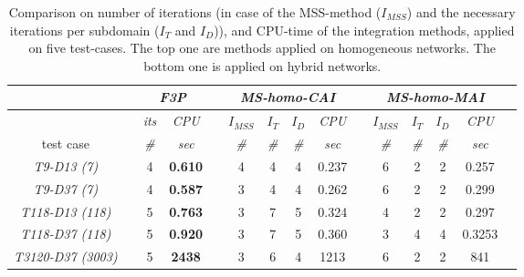 \begin{table}[!ht]
\renewcommand{\arraystretch}{1.3}
\centering
\caption{Comparison on number of iterations (in case of the MSS-method ($I_{MSS}$) and the necessary iterations per subdomain ($I_T$ and $I_D$)), and CPU-time of the integration methods, applied on five test-cases. The top one are methods applied on homogeneous networks. The bottom one is applied on hybrid networks. }\label{tab:speed}
\begin{adjustbox}{width=1\textwidth} %
\small
\begin{tabular}{@{}l c cc c  cccc c cccc c  @{}}\toprule
                               && \multicolumn{2}{c}{\textit{F3P}} &&     \multicolumn{4}{c}{\textit{MS-homo-CAI}} && \multicolumn{4}{c}{\textit{MS-homo-MAI}} \\ \midrule 
\multicolumn{1}{l}{}        && \textit{its}      & \textit{CPU} && $I_{MSS}$      & $I_T$   &  $I_D$      & \textit{CPU}     &&$I_{MSS}$      & $I_T$   &  $I_D$      & \textit{CPU}      \\
\cmidrule{3-4}  \cmidrule{6-9}  \cmidrule{11-14}   
\multicolumn{1}{c}{test case}      && \textit{\#}       & \textit{sec} && \textit{\#}      & \textit{\#}    & \textit{\#}       & \textit{sec}     && \textit{\#}        & \textit{\#}     &  \textit{\#}       & \textit{sec}  \\
\midrule
\multicolumn{1}{c}{\textit{T9-D13 (7)}}         && 4 &\textbf{ 0.610}    && 4 & 4 & 4 &  0.237 && 6 & 2 & 2  & {0.257}\\
\multicolumn{1}{c}{\textit{T9-D37 (7)}}         && 4 & \textbf{0.587}    && 3 & 4 & 4 &  0.262 && 6 & 2 & 2  & {0.299}\\
\multicolumn{1}{c}{{\textit{T118-D13 (118)}}}   && 5 & \textbf{0.763}    && 3 & 7 & 5  & 0.324 && 4 & 2 & 2 &  0.297  \\
\multicolumn{1}{c}{{\textit{T118-D37 (118)}}}   && 5 & \textbf{0.920}    && 3 & 7 & 5  & 0.360 && 3 & 4 & 4 &  0.3253\\
\multicolumn{1}{c}{{\textit{T3120-D37 (3003)}}} && 5 & \textbf{2438}     && 3 & 6 & 4  & 1213  && 6 & 2 & 2 &  841    \\

\end{tabular}
\end{adjustbox}
\end{table}
